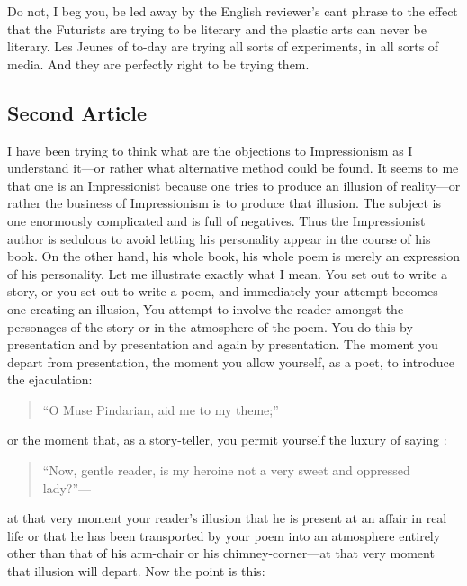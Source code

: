 Do not, I beg you, be led away by the English reviewer's cant phrase to
the effect that the Futurists are trying to be literary and the plastic
arts can never be literary. Les Jeunes of to-day are trying all sorts of
experiments, in all sorts of media. And they are perfectly right to be
trying them.

\subsection{Second Article}\label{second-article}

I have been trying to think what are the objections to Impressionism as
I understand it---or rather what alternative method could be found. It
seems to me that one is an Impressionist because one tries to produce an
illusion of reality---or rather the business of Impressionism is to
produce that illusion. The subject is one enormously complicated and is
full of negatives. Thus the Impressionist author is sedulous to avoid
letting his personality appear in the course of his book. On the other
hand, his whole book, his whole poem is merely an expression of his
personality. Let me illustrate exactly what I mean. You set out to write
a story, or you set out to write a poem, and immediately your attempt
becomes one creating an illusion, You attempt to involve the reader
amongst the personages of the story or in the atmosphere of the poem.
You do this by presentation and by presentation and again by
presentation. The moment you depart from presentation, the moment you
allow yourself, as a poet, to introduce the ejaculation:


\begin{verse} 

``O Muse Pindarian, aid me to my theme;''


\end{verse} 

or the moment that, as a story-teller, you permit yourself the luxury of
saying :

\begin{quote}
``Now, gentle reader, is my heroine not a very sweet and oppressed
lady?''---
\end{quote}

at that very moment your reader's illusion that he is present at an
affair in real life or that he has been transported by your poem into an
atmosphere entirely other than that of his arm-chair or his
chimney-corner---at that very moment that illusion will depart. Now the
point is this:

